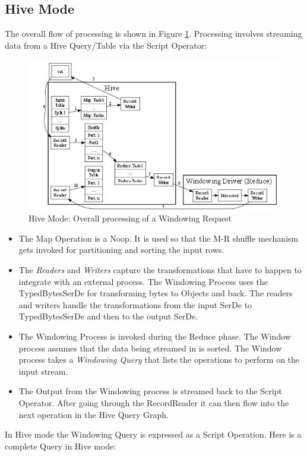 \documentclass[pdftex,10pt,a4paper]{article}
\begin{document}
\subsection{Hive Mode}
The overall flow of processing is shown in Figure \ref{hivearch}. Processing involves streaming data from a Hive Query/Table via the Script Operator:
\begin{figure}[h]
\centering
    \includegraphics[scale=0.5]{architecture.jpg}
\caption{Hive Mode: Overall processing of a Windowing Request}
\label{hivearch}
  \end{figure}
\begin{itemize}
\item The Map Operation is a Noop. It is used so that the M-R shuffle mechanism gets invoked for partitioning and sorting the input rows.
\item The {\em Readers} and {\em Writers}  capture the transformations that have to happen to integrate with an external process. The Windowing Process uses the TypedBytesSerDe for transforming bytes to Objects and back. The readers and writers handle the transformations from the input SerDe to TypedBytesSerDe and then to the output SerDe.
\item The Windowing Process is invoked during the Reduce phase. The Window process assumes that the data being streamed in is sorted. The Window process takes a {\em Windowing Query} that lists the operations to perform on the input stream.
\item The Output from the Windowing process is streamed back to the Script Operator. After going through the RecordReader it can then flow into the next operation in the Hive Query Graph.
\end{itemize}
In Hive mode the Windowing Query is expressed as a Script Operation. Here is a complete Query in Hive mode:
\end{document}
